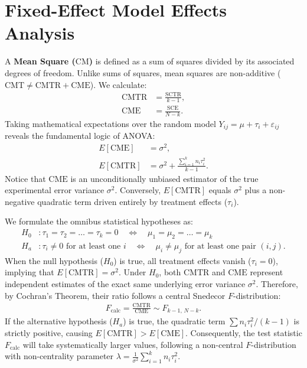 \section{Fixed-Effect Model Effects Analysis}

A \textbf{Mean Square ($\text{CM}$)} is defined as a sum of squares divided by its associated degrees of freedom. Unlike sums of squares, mean squares are non-additive ($\text{CMT} \neq \text{CMTR} + \text{CME}$). We calculate:
\begin{align}
	\text{CMTR} &= \frac{\text{SCTR}}{k - 1}, \\
	\text{CME} &= \frac{\text{SCE}}{N - k}.
\end{align}
Taking mathematical expectations over the random model $Y_{ij} = \mu + \tau_i + \varepsilon_{ij}$ reveals the fundamental logic of ANOVA:
\begin{align}
	E[\text{CME}] &= \sigma^2, \\
	E[\text{CMTR}] &= \sigma^2 + \frac{\sum_{i=1}^k n_i \tau_i^2}{k - 1}.
	\label{eq:esperanza_cmtr}
\end{align}
Notice that $\text{CME}$ is an unconditionally unbiased estimator of the true experimental error variance $\sigma^2$. Conversely, $E[\text{CMTR}]$ equals $\sigma^2$ plus a non-negative quadratic term driven entirely by treatment effects ($\tau_i$).

We formulate the omnibus statistical hypotheses as:
\begin{align}
	H_0&: \tau_1 = \tau_2 = \dots = \tau_k = 0 \quad \Longleftrightarrow \quad \mu_1 = \mu_2 = \dots = \mu_k \\
	H_a&: \tau_i \neq 0 \text{ for at least one } i \quad \Longleftrightarrow \quad \mu_i \neq \mu_j \text{ for at least one pair } (i,j).
\end{align}
When the null hypothesis ($H_0$) is true, all treatment effects vanish ($\tau_i = 0$), implying that $E[\text{CMTR}] = \sigma^2$. Under $H_0$, both $\text{CMTR}$ and $\text{CME}$ represent independent estimates of the exact same underlying error variance $\sigma^2$. Therefore, by Cochran's Theorem, their ratio follows a central Snedecor $F$-distribution:
\begin{align}
	F_{\text{calc}} = \frac{\text{CMTR}}{\text{CME}} \sim F_{k-1, \, N-k}.
\end{align}
If the alternative hypothesis ($H_a$) is true, the quadratic term $\sum n_i \tau_i^2 / (k-1)$ is strictly positive, causing $E[\text{CMTR}] > E[\text{CME}]$. Consequently, the test statistic $F_{\text{calc}}$ will take systematically larger values, following a non-central $F$-distribution with non-centrality parameter $\lambda = \frac{1}{\sigma^2} \sum_{i=1}^k n_i \tau_i^2$.

